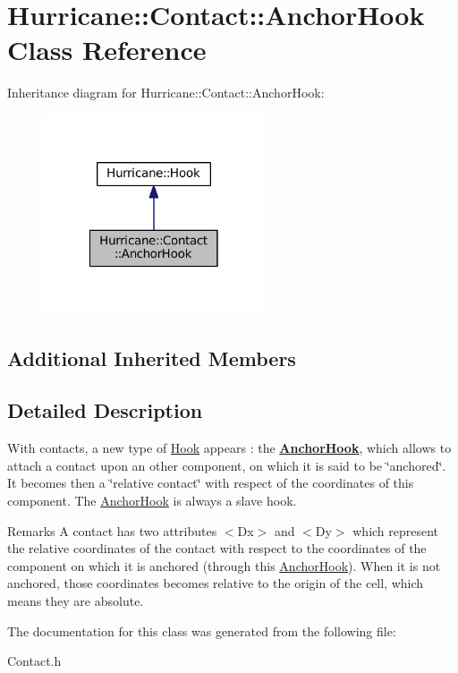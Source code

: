\hypertarget{classHurricane_1_1Contact_1_1AnchorHook}{}\section{Hurricane\+:\+:Contact\+:\+:Anchor\+Hook Class Reference}
\label{classHurricane_1_1Contact_1_1AnchorHook}


Inheritance diagram for Hurricane\+:\+:Contact\+:\+:Anchor\+Hook\+:\nopagebreak
\begin{figure}[H]
\begin{center}
\leavevmode
\includegraphics[width=186pt]{classHurricane_1_1Contact_1_1AnchorHook__inherit__graph}
\end{center}
\end{figure}
\subsection*{Additional Inherited Members}


\subsection{Detailed Description}
With contacts, a new type of \mbox{\hyperlink{classHurricane_1_1Hook}{Hook}} appears \+: the {\bfseries \mbox{\hyperlink{classHurricane_1_1Contact_1_1AnchorHook}{Anchor\+Hook}}}, which allows to attach a contact upon an other component, on which it is said to be \char`\"{}anchored\char`\"{}. It becomes then a \char`\"{}relative contact\char`\"{} with respect of the coordinates of this component. The \mbox{\hyperlink{classHurricane_1_1Contact_1_1AnchorHook}{Anchor\+Hook}} is always a slave hook.

\begin{DoxyRemark}{Remarks}
A contact has two attributes {\ttfamily $<$Dx$>$} and {\ttfamily $<$Dy$>$} which represent the relative coordinates of the contact with respect to the coordinates of the component on which it is anchored (through this \mbox{\hyperlink{classHurricane_1_1Contact_1_1AnchorHook}{Anchor\+Hook}}). When it is not anchored, those coordinates becomes relative to the origin of the cell, which means they are absolute. 
\end{DoxyRemark}


The documentation for this class was generated from the following file\+:\begin{DoxyCompactItemize}
\item 
Contact.\+h\end{DoxyCompactItemize}
